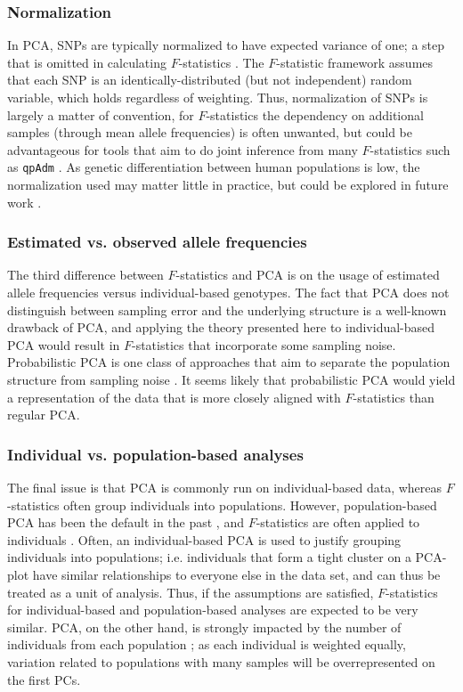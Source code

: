 \documentclass[12pt,fullpage, a4paper]{article}
\begin{document}
\subsubsection{Normalization}
In PCA, SNPs are typically normalized to have expected variance of one; a step that is omitted in calculating $F$-statistics \citep{patterson2012}. The $F$-statistic framework assumes that each SNP is an identically-distributed (but not independent) random variable, which holds regardless of weighting. Thus, normalization of SNPs is largely a matter of convention, for  $F$-statistics the dependency on  additional samples (through  mean allele frequencies) is often unwanted, but could be advantageous for tools that aim to do joint inference from  many $F$-statistics such as \texttt{qpAdm} \citep{patterson2012, harney2021}. As genetic differentiation between human populations is low, the  normalization used may matter little in practice, but could be explored in future work \citep{felsenstein1973}. 


\subsubsection{Estimated vs. observed allele frequencies}
The third difference between $F$-statistics and PCA is on the usage of estimated allele frequencies versus individual-based genotypes. The fact that PCA does not distinguish between sampling error and the underlying structure is a well-known drawback of PCA, and applying the theory presented here to individual-based PCA would result in $F$-statistics that incorporate some sampling noise. Probabilistic PCA is one class of approaches that aim to separate the population structure from sampling noise \citep[e.g.][]{agrawal2020}. It seems likely that probabilistic PCA would yield a representation of the data that is more closely aligned with $F$-statistics than regular PCA. 


\subsubsection{Individual vs. population-based analyses}
The final issue is that PCA is commonly run on individual-based data, whereas $F$-statistics often group individuals into populations. However, population-based PCA has been the default in the past \citep{cavalli-sforza1994}, and $F$-statistics are often applied to individuals \citep[e.g.][]{green2010, massilani2020, yang2020}. Often, an individual-based PCA is used to justify grouping individuals into populations; i.e. individuals that form a tight cluster on a PCA-plot have similar relationships to everyone else in the data set, and can thus be treated as a unit of analysis. Thus, if the assumptions are satisfied, $F$-statistics for individual-based and population-based analyses are expected to be very similar. PCA, on the other hand, is strongly impacted by the number of individuals from each population \citep[e.g.][]{mcvean2009}; as each individual is weighted equally, variation related to populations with many samples will be overrepresented on the first PCs.
\end{document}
